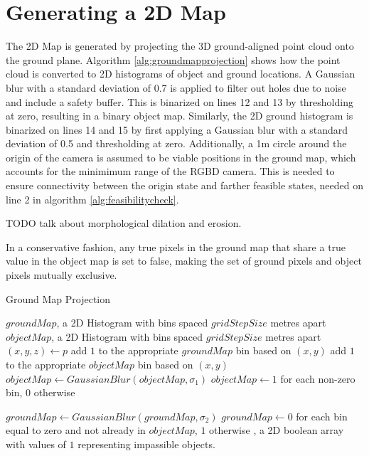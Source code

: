 \section{Generating a 2D Map}
\label{sec:2dmap}
The 2D Map is generated by projecting the 3D ground-aligned point cloud onto the
ground plane.
Algorithm \autoref{alg:groundmapprojection} shows how the point cloud is
converted to 2D histograms of object and ground locations. 
A Gaussian blur with
a standard deviation of 0.7 is applied to filter out holes due to noise and
include a safety buffer. This is binarized on lines 12 and 13 by thresholding at
zero, resulting in a binary object map.
Similarly, the 2D ground histogram is binarized on lines 14 and 15 by first applying a Gaussian
blur with a standard deviation of 0.5 and thresholding at zero. 
Additionally, a 1m circle around the origin of the camera is assumed to be
viable positions in the ground map, which accounts for the minimimum range of
the RGBD camera. This is needed to ensure connectivity between the origin state
and farther feasible states, needed on line 2 in algorithm
\autoref{alg:feasibilitycheck}.

TODO talk about morphological dilation and erosion.

In a conservative fashion, any true pixels in the ground map that share a true
value in the object map is set to false, making the set of ground pixels and
object pixels mutually exclusive. 

\begin{algorithm}
\caption{Ground Map Projection}
\label{alg:groundmapprojection}
\begin{algorithmic}[1]
\Statex
{}
    \State $groundMap$, a 2D Histogram with bins spaced $gridStepSize$ metres apart
    \State $objectMap$, a 2D Histogram with bins spaced $gridStepSize$ metres apart
        \State $(x,y,z) \gets p$
            \State add $1$ to the appropriate $groundMap$ bin based on $(x,y)$
        \Else
            \State add $1$ to the appropriate $objectMap$ bin based on $(x,y)$
        \EndIf
    \EndFor
    \State $objectMap \gets GaussianBlur(objectMap, \sigma_1)$
    \State $objectMap \gets 1$ for each non-zero bin, $0$ otherwise

    \State $groundMap \gets GaussianBlur(groundMap, \sigma_2)$
    \State $groundMap \gets 0$ for each bin equal to zero and not already in $objectMap$, $1$ otherwise
\EndFunction
\Statex
{}, a 2D boolean array with values of $1$ representing
impassible objects.
\end{algorithmic}
\end{algorithm}

